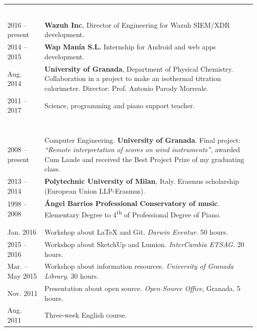 \documentclass[12pt,a4paper]{article}
\newcommand{\header}[1]{\multicolumn{2}{c}{\cellcolor{black} \textcolor{white} {\bfseries #1}} \\ \\[-12pt]}
\begin{document}
	\begin{longtable}{p{} p{}}
		\header{Work experience}
		2016 -- present & \textbf{Wazuh Inc.} \newline
		Director of Engineering for Wazuh SIEM/XDR development. \\
		2014 -- 2015 & \textbf{Wap Manía S.L.} \newline
		Internship for Android and web apps development. \\
		Aug. 2014 & \textbf{University of Granada}, Department of Physical Chemistry. \newline
		Collaboration in a project to make an isothermal titration
		calorimeter. Director: Prof. Antonio Parody Morreale. \\
		2011 -- 2017 & Science, programming and piano support teacher. \\
		\\
		\header{Education}
		2008 -- present & Computer Engineering. \textbf{University of Granada}. \newline
		Final project: \textit{``Remote interpretation of scores on wind instruments''},
		awarded Cum Laude and received the Best Project Prize of my graduating class. \\
		2013 -- 2014 & \textbf{Polytechnic University of Milan}, Italy. \newline
		Erasmus scholarship (European Union LLP-Erasmus). \\
		1998 -- 2008 & \textbf{Ángel Barrios Professional Conservatory of music}. \newline
		Elementary Degree to 4\textsuperscript{th} of Professional
		Degree of Piano. \\
		\newpage
		\header{Courses and events}
		Jan. 2016 & Workshop about LaTeX and Git. \newline
		\textit{Darwin Eventur}. 50 hours. \\
		2015 -- 2016 & Workshop about SketchUp and Lumion. \newline
		\textit{InterCambia ETSAG}. 20 hours. \\
		Mar. -- May 2015 & Workshop about information resources. \newline
		\textit{University of Granada Library}. 30 hours. \\
		Nov. 2011 & Presentation about open source. \newline
		\textit{Open Source Office}, Granada. 5 hours. \\
		Aug. 2011 & Three-week English course. \newline

\end{longtable}
\end{document}
